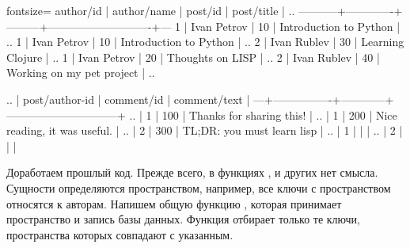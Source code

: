 

\begin{english}
  \begin{text*}{fontsize=\small}
 author/id | author/name | post/id |         post/title         | ..
-----------+-------------+---------+----------------------------+---
         1 | Ivan Petrov |      10 | Introduction to Python     | ..
         1 | Ivan Petrov |      10 | Introduction to Python     | ..
         2 | Ivan Rublev |      30 | Learning Clojure           | ..
         1 | Ivan Petrov |      20 | Thoughts on LISP           | ..
         2 | Ivan Rublev |      40 | Working on my pet project  | ..

.. | post/author-id | comment/id |         comment/text         |
---+----------------+------------+------------------------------+
.. |              1 |        100 | Thanks for sharing this!     |
.. |              1 |        200 | Nice reading, it was useful. |
.. |              2 |        300 | TL;DR: you must learn lisp   |
.. |              1 |            |                              |
.. |              2 |            |                              |
  \end{text*}
\end{english}

Доработаем прошлый код. Прежде всего, в функциях ,  и других нет смысла. Сущности определяются пространством, например, все ключи с пространством  относятся к авторам. Напишем общую функцию , которая принимает пространство и запись базы данных. Функция отбирает только те ключи, пространства которых совпадают с указанным.

